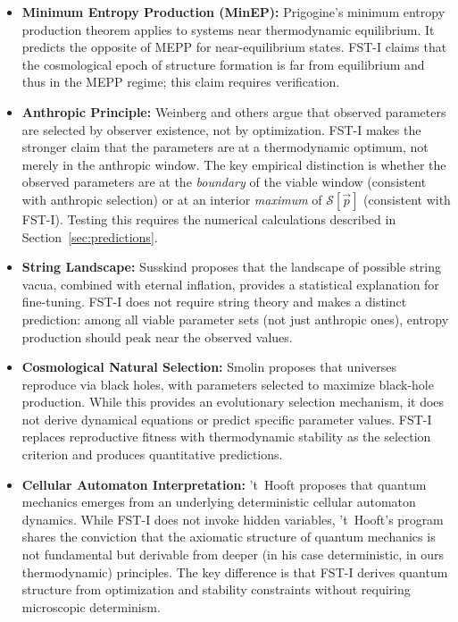 \documentclass[12pt,a4paper]{article}
\theoremstyle{remark}
\begin{document}
\begin{itemize}
    \item \textbf{Minimum Entropy Production (MinEP):} Prigogine's minimum entropy production theorem \citep{Prigogine1967} applies to systems near thermodynamic equilibrium. It predicts the opposite of MEPP for near-equilibrium states. FST-I claims that the cosmological epoch of structure formation is far from equilibrium and thus in the MEPP regime; this claim requires verification.
    \item \textbf{Anthropic Principle:} Weinberg \citep{Weinberg1987} and others argue that observed parameters are selected by observer existence, not by optimization. FST-I makes the stronger claim that the parameters are at a thermodynamic optimum, not merely in the anthropic window. The key empirical distinction is whether the observed parameters are at the \emph{boundary} of the viable window (consistent with anthropic selection) or at an interior \emph{maximum} of $\mathcal{S}[\vec{p}]$ (consistent with FST-I). Testing this requires the numerical calculations described in Section~\ref{sec:predictions}.
    \item \textbf{String Landscape:} Susskind \citep{Susskind2005} proposes that the landscape of possible string vacua, combined with eternal inflation, provides a statistical explanation for fine-tuning. FST-I does not require string theory and makes a distinct prediction: among all viable parameter sets (not just anthropic ones), entropy production should peak near the observed values.
    \item \textbf{Cosmological Natural Selection:} Smolin \citep{Smolin1992} proposes that universes reproduce via black holes, with parameters selected to maximize black-hole production. While this provides an evolutionary selection mechanism, it does not derive dynamical equations or predict specific parameter values. FST-I replaces reproductive fitness with thermodynamic stability as the selection criterion and produces quantitative predictions.
    \item \textbf{Cellular Automaton Interpretation:} 't~Hooft \citep{tHooft2016} proposes that quantum mechanics emerges from an underlying deterministic cellular automaton dynamics. While FST-I does not invoke hidden variables, 't~Hooft's program shares the conviction that the axiomatic structure of quantum mechanics is not fundamental but derivable from deeper (in his case deterministic, in ours thermodynamic) principles. The key difference is that FST-I derives quantum structure from optimization and stability constraints without requiring microscopic determinism.
\end{itemize}
\end{document}
